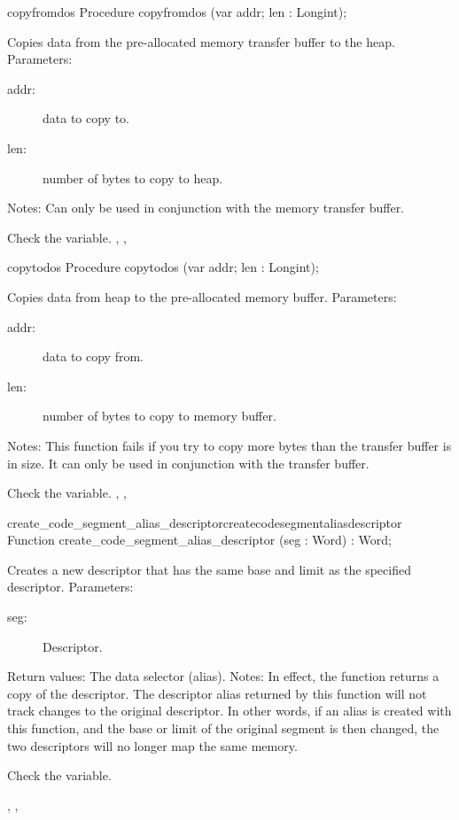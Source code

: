 \begin{procedure}{copyfromdos}
\Declaration
Procedure copyfromdos (var addr; len : Longint);

\Description

Copies data from the pre-allocated \dos memory transfer buffer to the heap.
Parameters:
\begin{description}
\item[addr:\ ] data to copy to.
\item[len:\ ] number of bytes to copy to heap.
\end{description}
Notes:
Can only be used in conjunction with the \dos memory transfer buffer.

\Errors
Check the  variable.
\SeeAlso
{}, , 
\end{procedure}
\begin{procedure}{copytodos}
\Declaration
Procedure copytodos (var addr; len : Longint);

\Description
Copies data from heap to the pre-allocated \dos memory buffer.
Parameters:
\begin{description}
\item[addr:\ ] data to copy from.
\item[len:\ ] number of bytes to copy to \dos memory buffer.
\end{description}
Notes: This function fails if you try to copy more bytes than the transfer
buffer is in size. It can only be used in conjunction with the transfer
buffer.

\Errors
 Check the  variable.
\SeeAlso
{}, , 
\end{procedure}
\begin{functionl}{create\_code\_segment\_alias\_descriptor}{createcodesegmentaliasdescriptor}
\Declaration
Function create\_code\_segment\_alias\_descriptor (seg : Word) : Word;

\Description

Creates a new descriptor that has the same base and limit as the specified
descriptor.
Parameters: 
\begin{description}
\item[seg:\ ] Descriptor.
\end{description}
Return values: The data selector (alias).
Notes: In effect, the function returns a copy of the descriptor. The
descriptor alias returned by this function will not track changes to the
original descriptor. In other words, if an alias is created with this
function, and the base or limit of the original segment is then changed, the
two descriptors will no longer map the same memory.

\Errors
Check the  variable.
\SeeAlso
 
,
, 
\end{functionl}
